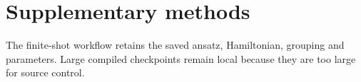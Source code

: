 \section*{Supplementary methods}The finite-shot workflow retains the saved ansatz, Hamiltonian, grouping and parameters. Large compiled checkpoints remain local because they are too large for source control.
